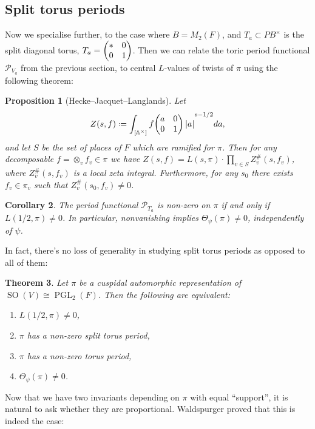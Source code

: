 \documentclass[11pt,a4paper,leqno]{article}
\let\mc\mathcal
\newcommand{\A}{\mathbb{A}}
\newcommand{\1}{\mathbbm{1}}
\newcommand*{\defeq}{\mathrel{\vcenter{\baselineskip0.5ex \lineskiplimit0pt
      \hbox{\scriptsize.}\hbox{\scriptsize.}}}%
  =}
\DeclareMathOperator{\SO}{SO}
\DeclareMathOperator{\PGL}{PGL}
\theoremstyle{plain}
\newtheorem{theorem}{Theorem}[section]
\newtheorem{cor}[theorem]{Corollary}
\newtheorem{prop}[theorem]{Proposition}
\theoremstyle{definition}
\theoremstyle{remark}
\numberwithin{equation}{section}
\begin{document}
\subsection{Split torus periods}
\label{sec:split-torus-periods}
Now we specialise further, to the case where $B = M_{2}(F)$, and
$T_{a} \subset PB^{\times}$ is the split diagonal torus, $T_{a} = \mqty(*  & 0 \\
0 & 1)$. Then we can relate the toric period functional $\mc
P_{V_{a}}$ from the previous section, to central $L$-values of twists
of $\pi$ using the following theorem:

\begin{prop}[Hecke--Jacquet--Langlands]
  Let
  \begin{equation}
    \label{eq:42}
    Z(s,f) \defeq \int_{[\A^{\times}]} f \mqty(a  & 0 \\ 0 & 1) |a|^{s-1/2}da,
  \end{equation}
  and let $S$ be the set of places of $F$ which are ramified for
  $\pi$. Then for any decomposable $f = \otimes_{v}f_{v} \in \pi$ we have $Z(s,f)
  = L(s,\pi) \cdot \prod_{v \in S}Z_{v}^{\#}(s,f_{v})$, where
  $Z_{v}^{\#}(s,f_{v})$ is a local zeta integral. Furthermore, for any
  $s_{0}$ there exists $f_{v} \in \pi_{v}$ such that
  $Z^{\#}_{v}(s_{0},f_{v}) \ne 0$.
\end{prop}
\begin{cor}
  The period functional $\mc P_{T_{a}}$ is non-zero on $\pi$ if and only
  if $L(1/2,\pi) \ne 0$. In particular, nonvanishing implies $\Theta_{\psi}(\pi) \ne
  0$, independently of $\psi$.
\end{cor}
In fact, there's no loss of generality in studying split torus
periods as opposed to all of them:

\begin{theorem}
  Let $\pi$ be a cuspidal automorphic representation of $\SO(V) \cong
  \PGL_{2}(F)$. Then the following are equivalent:
  \begin{enumerate}
  \item $L(1/2,\pi) \ne 0$, 
  \item $\pi$ has a non-zero split torus period,
  \item $\pi$ has a non-zero torus period,
  \item $\Theta_{\psi}(\pi) \ne 0$.
  \end{enumerate}
\end{theorem}

Now that we have two invariants depending on $\pi$ with equal
``support'', it is natural to ask whether they are proportional.
Waldspurger proved that this is indeed the case:
\end{document}
